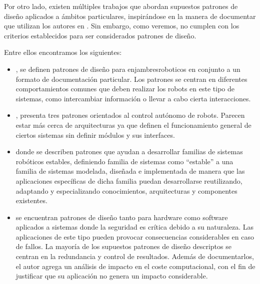 Por otro lado, existen múltiples trabajos que abordan supuestos patrones de diseño aplicados a ámbitos particulares, inspirándose en la manera de documentar que utilizan los autores en \cite{Gamma:1995:DPE:186897}. Sin embargo, como veremos, no cumplen con los criterios establecidos para ser considerados patrones de diseño.

Entre ellos encontramos los siguientes:

\begin{itemize}
\item \cite{enjambre}, se definen patrones de diseño para \gls{enjambresroboticos} en conjunto a un formato de documentación particular. Los patrones se centran en diferentes comportamientos comunes que deben realizar los robots en este tipo de sistemas, como intercambiar información o llevar a cabo cierta interacciones.

\item \cite{patterns_2013}, presenta tres patrones orientados al control autónomo de robots. Parecen estar más cerca de arquitecturas ya que definen el funcionamiento general de ciertos sistemas sin definir módulos y sus interfaces.

\item \cite{stable} donde se describen patrones que ayudan a desarrollar familias de sistemas robóticos estables, definiendo familia de sistemas como ``estable'' a una familia de sistemas modelada, diseñada e implementada de manera que las aplicaciones específicas de dicha familia puedan desarrollarse reutilizando, adaptando y especializando conocimientos, arquitecturas y componentes existentes.

\item \cite{critical} se encuentran patrones de diseño tanto para hardware como software aplicados a sistemas donde la seguridad es crítica debido a su naturaleza. Las aplicaciones de este tipo pueden provocar consecuencias considerables en caso de fallos. La mayoría de los supuestos patrones de diseño descriptos se centran en la redundancia y control de resultados. Además de documentarlos, el autor agrega un análisis de impacto en el coste computacional, con el fin de justificar que su aplicación no genera un impacto considerable.

\end{itemize}

